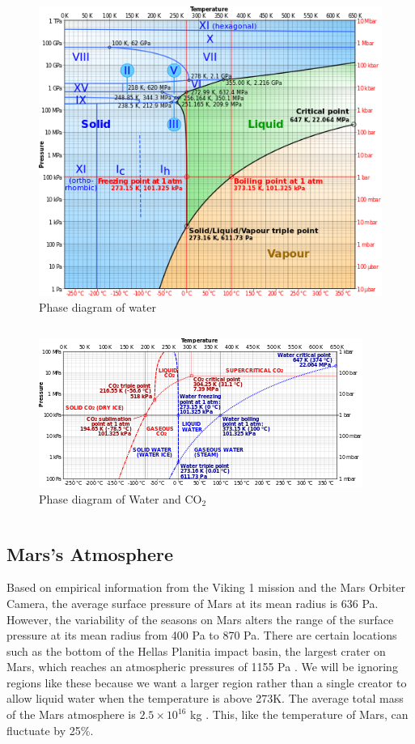 \documentclass[a4paper]{article}
\begin{document}
  \begin{figure}[h]
		\centering
		\includegraphics[scale=.5]{Ice_to_water.png}
		\caption{Phase diagram of water \cite{vinayak_vadlamani_if_2015}}
		\label{Figure 1: Phase Diagram}
	\end{figure} \[\]
    
    \begin{figure}[h]
		\centering
		\includegraphics[]{Water_and_CO2.png}
		\caption{Phase diagram of Water and CO$_2$ \cite{vinayak_vadlamani_if_2015}}
		\label{Figure 1: Phase of CO$_2$}
	\end{figure} \[\]
  
  \subsection{Mars's Atmosphere}
  
    Based on empirical information from the Viking 1 mission and the Mars Orbiter Camera, the average surface pressure of Mars at its mean radius is 636 Pa. However, the variability of the seasons on Mars alters the range of the surface pressure at its mean radius from 400 Pa to 870 Pa. \cite{nasa_mars_????} There are certain locations such as the bottom of the Hellas Planitia impact basin, the largest crater on Mars, which reaches an atmospheric pressures of 1155 Pa \cite{wikipedia_climate_2015}. We will be ignoring regions like these because we want a larger region rather than a single creator to allow liquid water when the temperature is above 273K. The average total mass of the Mars atmosphere is $2.5 \times 10^{16}$ kg \cite{nasa_mars_????}. This, like the temperature of Mars, can fluctuate by 25\%.
    
\end{document}
